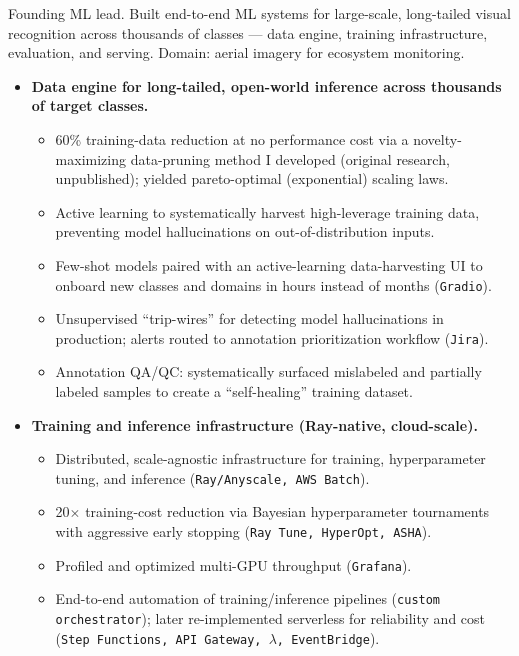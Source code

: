\documentclass[a4paper,12pt]{article}
\begin{document}
    \vspace{-6pt} Founding ML lead. Built end-to-end ML systems for large-scale, long-tailed visual recognition across thousands of classes --- data engine, training infrastructure, evaluation, and serving. Domain: aerial imagery for ecosystem monitoring.
    \begin{itemize}
        \item \textbf{Data engine for long-tailed, open-world inference across thousands of target classes.}
        \begin{itemize}
            \item 60\% training-data reduction at no performance cost via a novelty-maximizing data-pruning method I developed (original research, unpublished); yielded pareto-optimal (exponential) scaling laws.
            \item Active learning to systematically harvest high-leverage training data, preventing model hallucinations on out-of-distribution inputs.
            \item Few-shot models paired with an active-learning data-harvesting UI to onboard new classes and domains in hours instead of months (\texttt{Gradio}).
            \item Unsupervised ``trip-wires'' for detecting model hallucinations in production; alerts routed to annotation prioritization workflow (\texttt{Jira}).
            \item Annotation QA/QC: systematically surfaced mislabeled and partially labeled samples to create a ``self-healing'' training dataset.
        \end{itemize}
        \item \textbf{Training and inference infrastructure (Ray-native, cloud-scale).}
        \begin{itemize}
            \item Distributed, scale-agnostic infrastructure for training, hyperparameter tuning, and inference (\texttt{Ray/Anyscale, AWS Batch}).
            \item 20$\times$ training-cost reduction via Bayesian hyperparameter tournaments with aggressive early stopping (\texttt{Ray Tune, HyperOpt, ASHA}).
            \item Profiled and optimized multi-GPU throughput (\texttt{Grafana}).
            \item End-to-end automation of training/inference pipelines (\texttt{custom orchestrator}); later re-implemented serverless for reliability and cost (\texttt{Step Functions, API Gateway, $\lambda$, EventBridge}).

\end{itemize}
\end{itemize}
\end{document}

